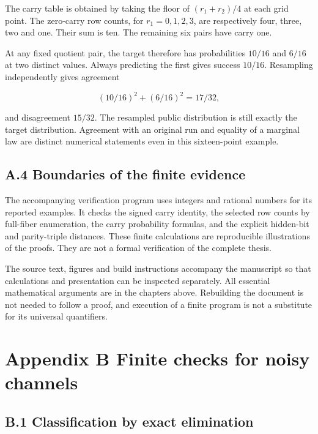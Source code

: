 \documentclass[
]{article}
\begin{document}
The carry table is obtained by taking the floor of \((r_1+r_2)/4\) at
each grid point. The zero-carry row counts, for \(r_1=0,1,2,3\), are
respectively four, three, two and one. Their sum is ten. The remaining
six pairs have carry one.

At any fixed quotient pair, the target therefore has probabilities
\(10/16\) and \(6/16\) at two distinct values. Always predicting the
first gives success \(10/16\). Resampling independently gives agreement

\[
(10/16)^2+(6/16)^2=17/32,
\]

and disagreement \(15/32\). The resampled public distribution is still
exactly the target distribution. Agreement with an original run and
equality of a marginal law are distinct numerical statements even in
this sixteen-point example.

\subsection{A.4 Boundaries of the finite
evidence}\label{a.4-boundaries-of-the-finite-evidence}

The accompanying verification program uses integers and rational numbers
for its reported examples. It checks the signed carry identity, the
selected row counts by full-fiber enumeration, the carry probability
formulas, and the explicit hidden-bit and parity-triple distances. These
finite calculations are reproducible illustrations of the proofs. They
are not a formal verification of the complete thesis.

The source text, figures and build instructions accompany the manuscript
so that calculations and presentation can be inspected separately. All
essential mathematical arguments are in the chapters above. Rebuilding
the document is not needed to follow a proof, and execution of a finite
program is not a substitute for its universal quantifiers.

\section{Appendix B Finite checks for noisy
channels}\label{appendix-b-finite-checks-for-noisy-channels}

\subsection{B.1 Classification by exact
elimination}\label{b.1-classification-by-exact-elimination}
\end{document}
